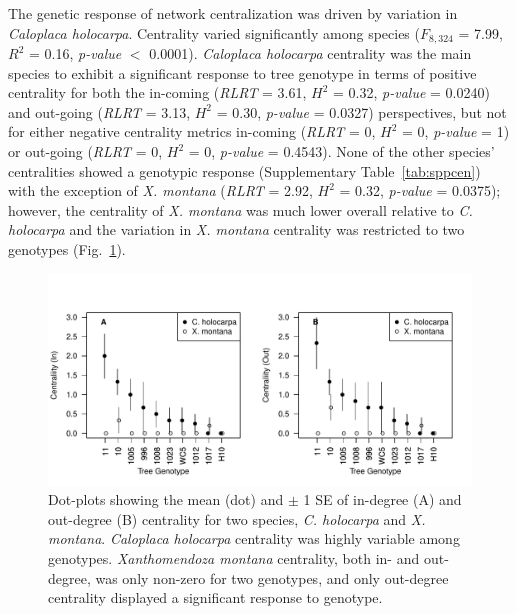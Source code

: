 \documentclass[fleqn,12pt]{olplainarticle}
\begin{document}


The genetic response of network centralization was driven by variation
in \textit{Caloplaca holocarpa}. Centrality varied significantly among
species ($F_{8, 324}$ = 7.99, $R^2$ = 0.16, \textit{p-value} $<$
0.0001). \textit{Caloplaca holocarpa} centrality was the main species
to exhibit a significant response to tree genotype in terms of
positive centrality for both the in-coming (\textit{RLRT} = 3.61,
$H^2$ = 0.32, \textit{p-value} = 0.0240) and out-going (\textit{RLRT}
= 3.13, $H^2$ = 0.30, \textit{p-value} = 0.0327) perspectives, but not
for either negative centrality metrics in-coming (\textit{RLRT} = 0,
$H^2$ = 0, \textit{p-value} = 1) or out-going (\textit{RLRT} = 0,
$H^2$ = 0, \textit{p-value} = 0.4543). None of the other species'
centralities showed a genotypic response (Supplementary
Table~\ref{tab:sppcen}) with the exception of \textit{X. montana}
(\textit{RLRT} = 2.92, $H^2$ = 0.32, \textit{p-value} = 0.0375);
however, the centrality of \textit{X. montana} was much lower overall
relative to \textit{C. holocarpa} and the variation in
\textit{X. montana} centrality was restricted to two genotypes
(Fig.~\ref{fig:geno_sppcen}).



\begin{figure}[ht]
\centering
\includegraphics[width=\linewidth]{geno_sppcen.pdf}
\caption{Dot-plots showing the mean (dot) and $\pm$ 1 SE of in-degree
  (A) and out-degree (B) centrality for two species,
  \textit{C. holocarpa} and \textit{X. montana}. \textit{Caloplaca
    holocarpa} centrality was highly variable among
  genotypes. \textit{Xanthomendoza montana} centrality, both in- and
  out-degree, was only non-zero for two genotypes, and only out-degree
  centrality displayed a significant response to genotype.}
\label{fig:geno_sppcen}
\end{figure}
\end{document}
